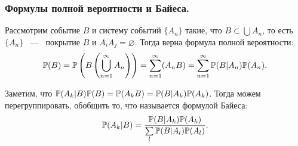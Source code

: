 \subsubsection{Формулы полной вероятности и Байеса.}
\begin{property}
    Рассмотрим событие $B$ и систему событий $\{A_n\}$ такие, что $B \subset \bigcup A_n$, то есть $\{A_n\}$ ~---~ покрытие $B$ и $A_iA_j = \varnothing$. Тогда верна формула полной вероятности: 
    \begin{gather*}
        \P(B) = \P\left(B\left(\bigcup\limits_{n = 1}^{\infty} A_n\right)\right) = \sum\limits_{n = 1}^{\infty} (A_nB) = \sum\limits_{n = 1}^{\infty}\P(B|A_n)\P(A_n).
    \end{gather*}
\end{property}

\begin{property}
    Заметим, что $\P(A_k|B)\P(B) = \P(A_kB) = \P(B|A_k)\P(A_k)$. Тогда можем перегруппировать, обобщить то, что называется формулой Байеса:
    \begin{gather*}
        \P(A_k|B) = \dfrac{\P(B|A_k)\P(A_k)}{\sum\limits_{l} \P(B|A_l)\P(A_l)}. 
    \end{gather*}

    
\end{property}
